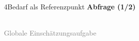 \documentclass[xcolor=table,9pt,aspectratio=169]{beamer}
\begin{document}
\begin{frame}{\vspace*{10mm}4\hspace*{1em}Bedarf als Referenzpunkt}
\textbf{Abfrage (1/2)}\\
\medskip
\begin{center}
   \\
   \textcolor{gray}{Globale Einschätzungsaufgabe}
\end{center}
\end{frame}
\end{document}
